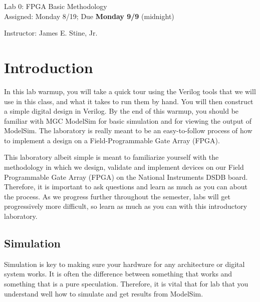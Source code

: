 \documentclass{article}
\newcommand{\myassignment}{Lab 0: FPGA Basic Methodology}
\newcommand{\myduedate}{Assigned: Monday 8/19; Due \textbf{Monday 9/9} (midnight)}
\newcommand{\myinstructor}{Instructor: James E. Stine, Jr.}
\begin{document}
\begin{center}
  {\huge \myassignment} \\
  {\large \myduedate} \\
  \begin{flushright}
  \myinstructor \\
  \end{flushright}
\end{center}

\section{Introduction}

In this lab warmup, you will take a quick tour using the 
Verilog tools that we will use
in this class, and what it takes to run them by hand. You will then
construct a simple digital design in Verilog.
By the end of this warmup, you should be
familiar with MGC ModelSim for basic simulation and for viewing the
output of ModelSim. The laboratory is really meant to be an
easy-to-follow process of how to implement a design on a
Field-Programmable Gate Array (FPGA).

This laboratory albeit simple
is meant to familiarize yourself with the methodology in which we
design, validate and implement devices on our Field Programmable Gate
Array (FPGA) on the National Instruments DSDB board.  Therefore, it is
important to ask questions and learn as much as you can about the
process.  As we progress further throughout the semester, labs will
get progressively more difficult, so learn as much as you can with
this introductory laboratory.

\subsection{Simulation}

Simulation is key to making sure your hardware for any architecture or
digital system works.  It is often the difference between something
that works and something that is a pure speculation.  Therefore, it is
vital that for lab that you understand well how to simulate and get
results from ModelSim.
\end{document}
